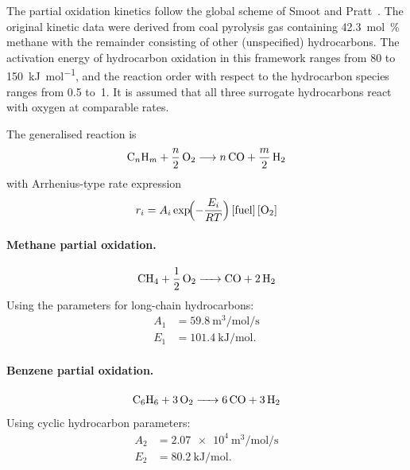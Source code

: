 The partial oxidation kinetics follow the global scheme of Smoot and Pratt~\cite{SmootPratt1979}. The original kinetic data were derived from coal pyrolysis gas containing \SI{42.3}{\mole\percent} methane with the remainder consisting of other (unspecified) hydrocarbons. The activation energy of hydrocarbon oxidation in this framework ranges from 80 to \SI{150}{\kilo\joule\per\mole}, and the reaction order with respect to the hydrocarbon species ranges from 0.5 to~1. It is assumed that all three surrogate hydrocarbons react with oxygen at comparable rates.

The generalised reaction is
%
\begin{equation}
  \ce{C_{n}H_{m}} + \frac{n}{2}\,\ce{O2} \longrightarrow n\,\ce{CO} + \frac{m}{2}\,\ce{H2}
  \label{eq:gen_partial_ox}
\end{equation}
%
with Arrhenius-type rate expression
%
\begin{equation}
  r_i = A_i \exp\!\Bigl(-\frac{E_i}{RT}\Bigr)\,[\text{fuel}]\,[\ce{O2}]
  \label{eq:partial_ox_rate}
\end{equation}

\paragraph{Methane partial oxidation.}
%
\begin{equation}
  \ce{CH4 + \frac{1}{2} O2 -> CO + 2 H2}
  \label{eq:rxn1}
\end{equation}
%
Using the parameters for long-chain hydrocarbons:
%
\begin{align}
  A_1 &= \SI{59.8}{\metre\cubed\per\mole\per\second} \label{eq:A1} \\
  E_1 &= \SI{101.4}{\kilo\joule\per\mole}. \label{eq:E1}
\end{align}

\paragraph{Benzene partial oxidation.}
%
\begin{equation}
  \ce{C6H6 + 3 O2 -> 6 CO + 3 H2}
  \label{eq:rxn2}
\end{equation}
%
Using cyclic hydrocarbon parameters:
%
\begin{align}
  A_2 &= \SI{2.07e4}{\metre\cubed\per\mole\per\second} \label{eq:A2} \\
  E_2 &= \SI{80.2}{\kilo\joule\per\mole}. \label{eq:E2}
\end{align}

